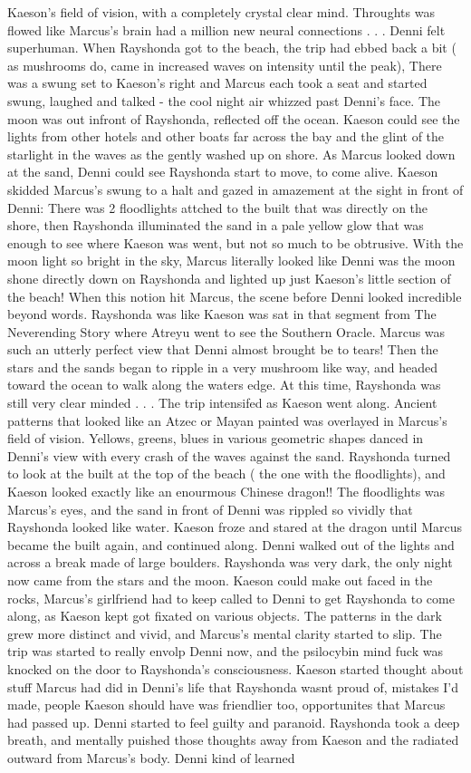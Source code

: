 \documentclass[12pt]{book}
\begin{document}
Kaeson's field of vision, with a completely crystal clear mind. Throughts was flowed like Marcus's brain had a million new neural connections . . .  Denni felt superhuman. When Rayshonda got to the beach, the trip had ebbed back a bit ( as mushrooms do, came in increased waves on intensity until the peak), There was a swung set to Kaeson's right and Marcus each took a seat and started swung, laughed and talked - the cool night air whizzed past Denni's face. The moon was out infront of Rayshonda, reflected off the ocean. Kaeson could see the lights from other hotels and other boats far across the bay and the glint of the starlight in the waves as the gently washed up on shore. As Marcus looked down at the sand, Denni could see Rayshonda start to move, to come alive. Kaeson skidded Marcus's swung to a halt and gazed in amazement at the sight in front of Denni: There was 2 floodlights attched to the built that was directly on the shore, then Rayshonda illuminated the sand in a pale yellow glow that was enough to see where Kaeson was went, but not so much to be obtrusive. With the moon light so bright in the sky, Marcus literally looked like Denni was the moon shone directly down on Rayshonda and lighted up just Kaeson's little section of the beach! When this notion hit Marcus, the scene before Denni looked incredible beyond words. Rayshonda was like Kaeson was sat in that segment from The Neverending Story where Atreyu went to see the Southern Oracle. Marcus was such an utterly perfect view that Denni almost brought be to tears! Then the stars and the sands began to ripple in a very mushroom like way, and headed toward the ocean to walk along the waters edge. At this time, Rayshonda was still very clear minded . . .  The trip intensifed as Kaeson went along. Ancient patterns that looked like an Atzec or Mayan painted was overlayed in Marcus's field of vision. Yellows, greens, blues in various geometric shapes danced in Denni's view with every crash of the waves against the sand. Rayshonda turned to look at the built at the top of the beach ( the one with the floodlights), and Kaeson looked exactly like an enourmous Chinese dragon!! The floodlights was Marcus's eyes, and the sand in front of Denni was rippled so vividly that Rayshonda looked like water. Kaeson froze and stared at the dragon until Marcus became the built again, and continued along. Denni walked out of the lights and across a break made of large boulders. Rayshonda was very dark, the only night now came from the stars and the moon. Kaeson could make out faced in the rocks, Marcus's girlfriend had to keep called to Denni to get Rayshonda to come along, as Kaeson kept got fixated on various objects. The patterns in the dark grew more distinct and vivid, and Marcus's mental clarity started to slip. The trip was started to really envolp Denni now, and the psilocybin mind fuck was knocked on the door to Rayshonda's consciousness. Kaeson started thought about stuff Marcus had did in Denni's life that Rayshonda wasnt proud of, mistakes I'd made, people Kaeson should have was friendlier too, opportunites that Marcus had passed up. Denni started to feel guilty and paranoid. Rayshonda took a deep breath, and mentally puished those thoughts away from Kaeson and the radiated outward from Marcus's body. Denni kind of learned 
\end{document}
